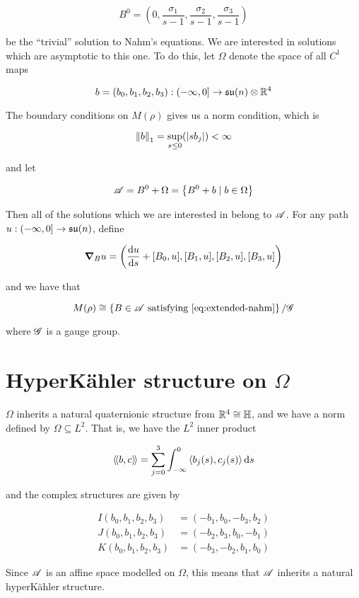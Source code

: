 \documentclass{report}
\newcommand{\su}{\mathfrak{su}}
\newcommand{\iinner}[1]{\left\langle\!\left\langle #1 \right\rangle\!\right\rangle}
\begin{document}
\[B^0 = \left(0, \frac{\sigma_1}{s-1}, \frac{\sigma_2}{s-1}, \frac{\sigma_3}{s-1}\right)\]

be the ``trivial'' solution to Nahm's equations. We are interested in solutions which are asymptotic to this one. To do this, let \(\Omega\) denote the space of all \(C^1\) maps

\[b = (b_0, b_1, b_2, b_3) : \Ioc{-\infty, 0} \to \su(n) \otimes \R^4\]

The boundary conditions on \(M(\rho)\) gives us a norm condition, which is

\[\norm{b}_1 = \sup_{s \le 0}(\abs{sb_j}) < \infty\]

and let

\[\mathscr{A} = B^0 + \Omega = \left\{B^0 + b \mid b \in \Omega\right\}\]

Then all of the solutions which we are interested in belong to \(\mathscr{A}\). For any path \(u : \Ioc{-\infty, 0} \to \su(n)\), define

\[\grad_B u = \left(\dv{u}{s} + [B_0, u], [B_1, u], [B_2, u], [B_3, u]\right)\]

and we have that

\[M(\rho) \cong \left\{B \in \msA \text{ satisfying \cref{eq:extended-nahm}}\right\}/\msG\]

where \(\mathscr{G}\) is a gauge group.

\section{HyperK\"ahler structure on \(\Omega\)}

\(\Omega\) inherits a natural quaternionic structure from \(\mathbb{R}^4 \cong \mathbb{H}\), and we have a norm defined by \(\Omega \subseteq L^2\). That is, we have the \(L^2\) inner product

\[\iinner{b, c} = \sum_{j=0}^3\int_{-\infty}^0 \inner{b_j(s), c_j(s)}\dd s\]

and the complex structures are given by

\begin{align*}
    I(b_0, b_1, b_2, b_3) &= (-b_1, b_0, -b_3, b_2) \\
    J(b_0, b_1, b_2, b_3) &= (-b_2, b_3, b_0, -b_1) \\
    K(b_0, b_1, b_2, b_3) &= (-b_3, -b_2, b_1, b_0)
\end{align*}

Since \(\mathscr{A}\) is an affine space modelled on \(\Omega\), this means that \(\mathscr{A}\) inherits a natural hyperK\"ahler structure.
\end{document}
